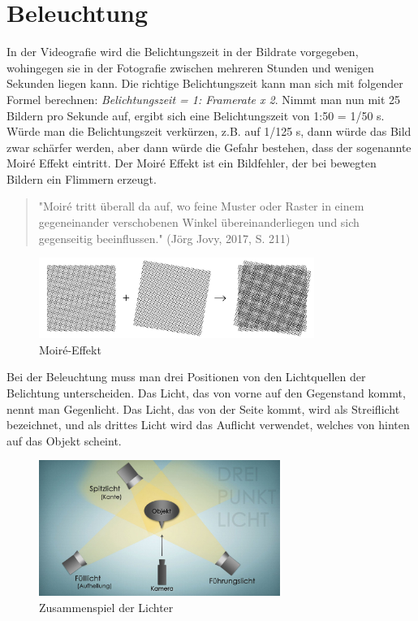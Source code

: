 \section{Beleuchtung}
In der Videografie wird die Belichtungszeit in der Bildrate vorgegeben, wohingegen sie in der Fotografie zwischen mehreren Stunden und wenigen Sekunden liegen kann.
Die richtige Belichtungszeit kann man sich mit folgender Formel berechnen: \textit{Belichtungszeit = 1: Framerate x 2}. Nimmt man nun mit 25 Bildern pro Sekunde auf, ergibt sich eine Belichtungszeit von 1:50 = 1/50 s. Würde man die Belichtungszeit verkürzen, z.B. auf 1/125 s, dann würde das Bild zwar schärfer werden, aber dann würde die Gefahr bestehen, dass der sogenannte Moir\'{e} Effekt eintritt. Der Moir\'{e} Effekt ist ein Bildfehler, der bei bewegten Bildern ein Flimmern erzeugt. \begin{quote}"Moir\'{e} tritt überall da auf, wo feine Muster oder Raster in einem gegeneinander verschobenen Winkel übereinanderliegen und sich gegenseitig beeinflussen." (Jörg Jovy, 2017, S. 211)\end{quote}
\begin{figure}[H]
	\centering
	\includegraphics[width=0.8\textwidth]{abb2} 
	\caption[Moir\'{e}-Effekt]{Moir\'{e}-Effekt\footnotemark}
\end{figure}
Bei der Beleuchtung muss man drei Positionen von den Lichtquellen der Belichtung unterscheiden. Das Licht, das von vorne auf den Gegenstand kommt, nennt man Gegenlicht. Das Licht, das von der Seite kommt, wird als Streiflicht bezeichnet, und als drittes Licht wird das Auflicht verwendet, welches von hinten auf das Objekt scheint.\citep{beleuchtung}
\begin{figure}[H]
	\centering
	\includegraphics[width=0.7\textwidth]{abb3}
	\caption[Zusammenspiel der Lichter]{Zusammenspiel der Lichter\footnotemark}\label{fig:abb3}
\end{figure}
